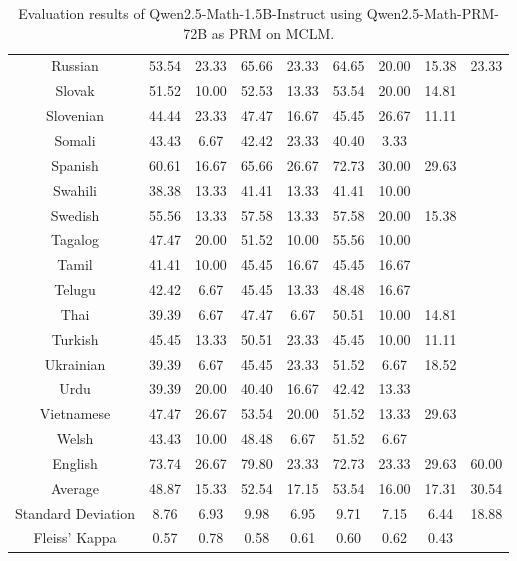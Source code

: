 \begin{table*}[]
\begin{tabular}{c|cc|cc|cccl}
Russian & 53.54 & 23.33 & 65.66 & 23.33 & 64.65 & 20.00 & 15.38 & \multicolumn{1}{c}{23.33} \\
Slovak & 51.52 & 10.00 & 52.53 & 13.33 & 53.54 & 20.00 & 14.81 &  \\
Slovenian & 44.44 & 23.33 & 47.47 & 16.67 & 45.45 & 26.67 & 11.11 &  \\
Somali & 43.43 & 6.67 & 42.42 & 23.33 & 40.40 & 3.33 & \multicolumn{1}{l}{} &  \\
Spanish & 60.61 & 16.67 & 65.66 & 26.67 & 72.73 & 30.00 & 29.63 &  \\
Swahili & 38.38 & 13.33 & 41.41 & 13.33 & 41.41 & 10.00 & \multicolumn{1}{l}{} &  \\
Swedish & 55.56 & 13.33 & 57.58 & 13.33 & 57.58 & 20.00 & 15.38 &  \\
Tagalog & 47.47 & 20.00 & 51.52 & 10.00 & 55.56 & 10.00 & \multicolumn{1}{l}{} &  \\
Tamil & 41.41 & 10.00 & 45.45 & 16.67 & 45.45 & 16.67 & \multicolumn{1}{l}{} &  \\
Telugu & 42.42 & 6.67 & 45.45 & 13.33 & 48.48 & 16.67 & \multicolumn{1}{l}{} &  \\
Thai & 39.39 & 6.67 & 47.47 & 6.67 & 50.51 & 10.00 & 14.81 &  \\
Turkish & 45.45 & 13.33 & 50.51 & 23.33 & 45.45 & 10.00 & 11.11 &  \\
Ukrainian & 39.39 & 6.67 & 45.45 & 23.33 & 51.52 & 6.67 & 18.52 &  \\
Urdu & 39.39 & 20.00 & 40.40 & 16.67 & 42.42 & 13.33 & \multicolumn{1}{l}{} &  \\
Vietnamese & 47.47 & 26.67 & 53.54 & 20.00 & 51.52 & 13.33 & 29.63 &  \\
Welsh & 43.43 & 10.00 & 48.48 & 6.67 & 51.52 & 6.67 & \multicolumn{1}{l}{} &  \\
\rowcolor[HTML]{FCE5CD}English & 73.74 & 26.67 & 79.80 & 23.33 & 72.73 & 23.33 & 29.63 & \multicolumn{1}{c}{60.00} \\ \midrule
Average & 48.87 & 15.33 & 52.54 & 17.15 & 53.54 & 16.00 & 17.31 & \multicolumn{1}{c}{30.54} \\
Standard Deviation & 8.76 & 6.93 & 9.98 & 6.95 & 9.71 & 7.15 & 6.44 & \multicolumn{1}{c}{18.88} \\
Fleiss' Kappa & 0.57 & 0.78 & 0.58 & 0.61 & 0.60 & 0.62 & 0.43 & \\ \bottomrule
\end{tabular}
\caption{\footnotesize Evaluation results of Qwen2.5-Math-1.5B-Instruct using Qwen2.5-Math-PRM-72B as PRM on MCLM.}
\label{tab:1_5B_prm_72B}
\end{table*}

